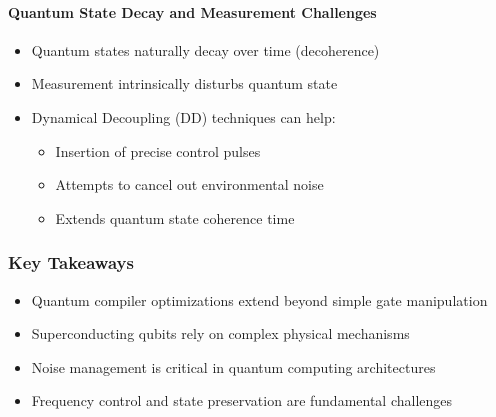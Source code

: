 \paragraph{Quantum State Decay and Measurement Challenges}
\begin{itemize}
  \item Quantum states naturally decay over time (decoherence)

  \item Measurement intrinsically disturbs quantum state

  \item Dynamical Decoupling (DD) techniques can help:
    \begin{itemize}
      \item Insertion of precise control pulses
      \item Attempts to cancel out environmental noise
      \item Extends quantum state coherence time
    \end{itemize}
\end{itemize}

\subsubsection*{Key Takeaways}

\begin{itemize}
  \item Quantum compiler optimizations extend beyond simple gate manipulation
  \item Superconducting qubits rely on complex physical mechanisms
  \item Noise management is critical in quantum computing architectures
  \item Frequency control and state preservation are fundamental challenges
\end{itemize}


